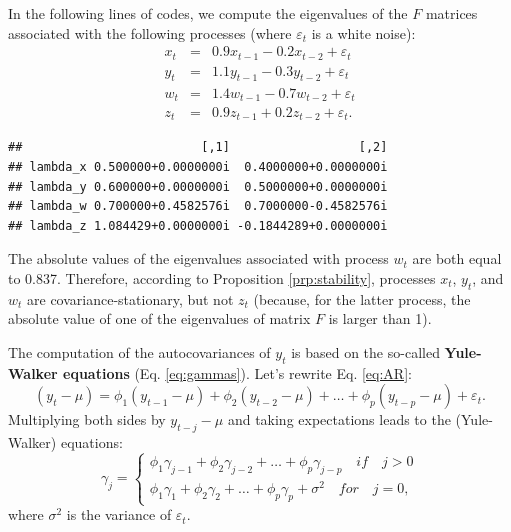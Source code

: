 \documentclass[
  11pt,
]{book}
\theoremstyle{definition}
\theoremstyle{definition}
\theoremstyle{definition}
\theoremstyle{definition}
\theoremstyle{remark}
\begin{document}
In the following lines of codes, we compute the eigenvalues of the \(F\) matrices associated with the following processes (where \(\varepsilon_t\) is a white noise):
\begin{eqnarray*}
x_t &=& 0.9 x_{t-1} -0.2 x_{t-2} + \varepsilon_t\\
y_t &=& 1.1 y_{t-1} -0.3 y_{t-2} + \varepsilon_t\\
w_t &=& 1.4 w_{t-1} -0.7 w_{t-2} + \varepsilon_t\\
z_t &=& 0.9 z_{t-1} +0.2 z_{t-2} + \varepsilon_t.
\end{eqnarray*}

\begin{verbatim}
##                         [,1]                  [,2]
## lambda_x 0.500000+0.0000000i  0.4000000+0.0000000i
## lambda_y 0.600000+0.0000000i  0.5000000+0.0000000i
## lambda_w 0.700000+0.4582576i  0.7000000-0.4582576i
## lambda_z 1.084429+0.0000000i -0.1844289+0.0000000i
\end{verbatim}

The absolute values of the eigenvalues associated with process \(w_t\) are both equal to 0.837. Therefore, according to Proposition \ref{prp:stability}, processes \(x_t\), \(y_t\), and \(w_t\) are covariance-stationary, but not \(z_t\) (because, for the latter process, the absolute value of one of the eigenvalues of matrix \(F\) is larger than 1).

The computation of the autocovariances of \(y_t\) is based on the so-called \textbf{Yule-Walker equations} (Eq. \eqref{eq:gammas}). Let's rewrite Eq. \eqref{eq:AR}:
\[
(y_t-\mu) = \phi_1 (y_{t-1}-\mu) + \phi_2 (y_{t-2}-\mu) + \dots + \phi_p (y_{t-p}-\mu) + \varepsilon_t.
\]
Multiplying both sides by \(y_{t-j}-\mu\) and taking expectations leads to the (Yule-Walker) equations:
\begin{equation}
\gamma_j = \left\{
\begin{array}{l}
\phi_1 \gamma_{j-1}+\phi_2 \gamma_{j-2}+ \dots + \phi_p \gamma_{j-p} \quad if \quad j>0\\
\phi_1 \gamma_{1}+\phi_2 \gamma_{2}+ \dots + \phi_p \gamma_{p} + \sigma^2 \quad for \quad j=0,
\end{array}
\right.\label{eq:gammas}
\end{equation}
where \(\sigma^2\) is the variance of \(\varepsilon_t\).
\end{document}
